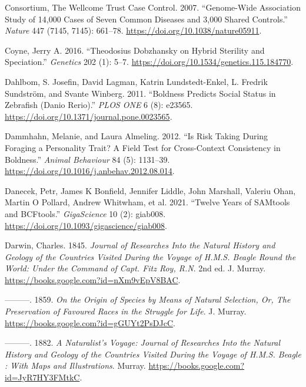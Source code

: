 \documentclass[
]{book}
\newlength{\cslhangindent}
\newlength{\cslentryspacingunit} %
\newenvironment{CSLReferences}[2] %
 {%
  \setlength{\parindent}{0pt}
  \ifodd #1
  \let\oldpar\par
  \def\par{\hangindent=\cslhangindent\oldpar}
  \fi
  \setlength{\parskip}{#2\cslentryspacingunit}
 }%
 {}
\begin{document}
\begin{CSLReferences}{1}{0}
\leavevmode{}%
Consortium, The Wellcome Trust Case Control. 2007. {``Genome-Wide Association Study of 14,000 Cases of Seven Common Diseases and 3,000 Shared Controls.''} \emph{Nature} 447 (7145, 7145): 661--78. \url{https://doi.org/10.1038/nature05911}.

\leavevmode{}%
Coyne, Jerry A. 2016. {``Theodosius {Dobzhansky} on {Hybrid Sterility} and {Speciation}.''} \emph{Genetics} 202 (1): 5--7. \url{https://doi.org/10.1534/genetics.115.184770}.

\leavevmode{}%
Dahlbom, S. Josefin, David Lagman, Katrin Lundstedt-Enkel, L. Fredrik Sundström, and Svante Winberg. 2011. {``Boldness {Predicts Social Status} in {Zebrafish} ({Danio} Rerio).''} \emph{PLOS ONE} 6 (8): e23565. \url{https://doi.org/10.1371/journal.pone.0023565}.

\leavevmode{}%
Dammhahn, Melanie, and Laura Almeling. 2012. {``Is Risk Taking During Foraging a Personality Trait? {A} Field Test for Cross-Context Consistency in Boldness.''} \emph{Animal Behaviour} 84 (5): 1131--39. \url{https://doi.org/10.1016/j.anbehav.2012.08.014}.

\leavevmode{}%
Danecek, Petr, James K Bonfield, Jennifer Liddle, John Marshall, Valeriu Ohan, Martin O Pollard, Andrew Whitwham, et al. 2021. {``Twelve Years of {SAMtools} and {BCFtools}.''} \emph{GigaScience} 10 (2): giab008. \url{https://doi.org/10.1093/gigascience/giab008}.

\leavevmode{}%
Darwin, Charles. 1845. \emph{Journal of {Researches Into} the {Natural History} and {Geology} of the {Countries Visited During} the {Voyage} of {H}.{M}.{S}. {Beagle Round} the {World}: {Under} the {Command} of {Capt}. {Fitz Roy}, {R}.{N}}. 2nd ed. {J. Murray}. \url{https://books.google.com?id=nXm9vEpV8BAC}.

\leavevmode{}%
---------. 1859. \emph{On the {Origin} of {Species} by {Means} of {Natural Selection}, {Or}, {The Preservation} of {Favoured Races} in the {Struggle} for {Life}}. {J. Murray}. \url{https://books.google.com?id=gGUYt2PsDJcC}.

\leavevmode{}%
---------. 1882. \emph{A {Naturalist}'s {Voyage}: {Journal} of {Researches Into} the {Natural History} and {Geology} of the {Countries Visited During} the {Voyage} of {H}.{M}.{S}. {Beagle} : With {Maps} and {Illustrations}}. {Murray}. \url{https://books.google.com?id=JyR7HY3FMtkC}.


\end{CSLReferences}
\end{document}
